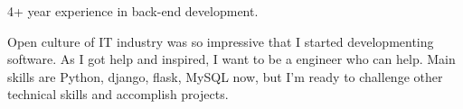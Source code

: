 

\begin{cvparagraph}

4+ year experience in back-end development.

Open culture of IT industry was so impressive that I started developmenting software. As I got help and inspired, I want to be a engineer who can help.
Main skills are Python, django, flask, MySQL now, but I'm ready to challenge other technical skills and accomplish projects.

\end{cvparagraph}
